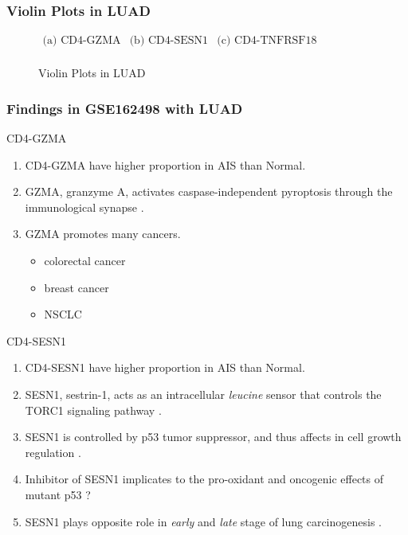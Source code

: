 \documentclass{beamer}
\begin{document}
    \begin{frame}[allowframebreaks]
        \frametitle{Violin Plots in LUAD}

        \begin{figure}
            $\begin{array}{ccc}
                \mbox{(a) CD4-GZMA} & \mbox{(b) CD4-SESN1} & \mbox{(c) CD4-TNFRSF18} \\
            \end{array}$
            \caption{Violin Plots in LUAD}
        \end{figure}
    \end{frame}

    \begin{frame}[allowframebreaks]
        \frametitle{Findings in GSE162498 with LUAD}

        \begin{block}{CD4-GZMA}
            \begin{enumerate}
                \item CD4-GZMA have higher proportion in AIS than Normal.
                \item GZMA, granzyme A, activates caspase-independent pyroptosis through the immunological synapse \cite{GZMA-1, GZMA-2, GZMA-3}.
                \item GZMA promotes many cancers.
                \begin{itemize}
                    \item colorectal cancer \cite{GZMA-4, GZMA-5}
                    \item breast cancer \cite{GZMA-6}
                    \item NSCLC \cite{GZMA-7}
                \end{itemize}
            \end{enumerate}
        \end{block}

        \begin{block}{CD4-SESN1}
            \begin{enumerate}
                \item CD4-SESN1 have higher proportion in AIS than Normal.
                \item SESN1, sestrin-1, acts as an intracellular \textit{leucine} sensor that controls the TORC1 signaling pathway \cite{SESN1-1, SESN1-2}.
                \item SESN1 is controlled by p53 tumor suppressor, and thus affects in cell growth regulation \cite{SESN1-3}.
                \item Inhibitor of SESN1 implicates to the pro-oxidant and oncogenic effects of mutant p53 \cite{SESN1-4}?
                \item SESN1 plays opposite role in \textit{early} and \textit{late} stage of lung carcinogenesis \cite{SESN1-5}.
            \end{enumerate}
        \end{block}


\end{frame}
\end{document}
